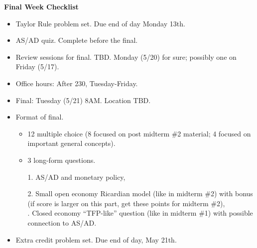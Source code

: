 \documentclass[12pt,pdftex,twoside,letterpaper]{exam}
\begin{document}
\centerline{}
\smallskip
\centerline{\Large \bf Final Week Checklist}


\begin{itemize}
\item Taylor Rule problem set. Due end of day Monday 13th.
\bigskip
\bigskip
\item AS/AD quiz. Complete before the final.
\bigskip
\bigskip
\item Review sessions for final.  TBD. Monday (5/20) for sure; possibly one on Friday (5/17).
\bigskip
\bigskip
\item Office hours: After 230, Tuesday-Friday. 
\bigskip
\bigskip
\item Final: Tuesday (5/21) 8AM. Location TBD. 
\bigskip
\bigskip
\item Format of final. 
\begin{itemize}
\item 12 multiple choice (8 focused on post midterm \#2 material; 4 focused on important general concepts).\\
\medskip
\item 3 long-form questions.\\
\medskip

1. AS/AD and monetary policy,\\
\medskip

2. Small open economy Ricardian model (like in midterm \#2) with bonus (if score is larger on this part, get these points for midterm \#2),\\

. Closed economy ``TFP-like'' question (like in midterm \#1) with possible connection to AS/AD. 
\end{itemize}
\bigskip
\bigskip
\item Extra credit problem set. Due end of day, May 21th.
\end{itemize}
\end{document}
